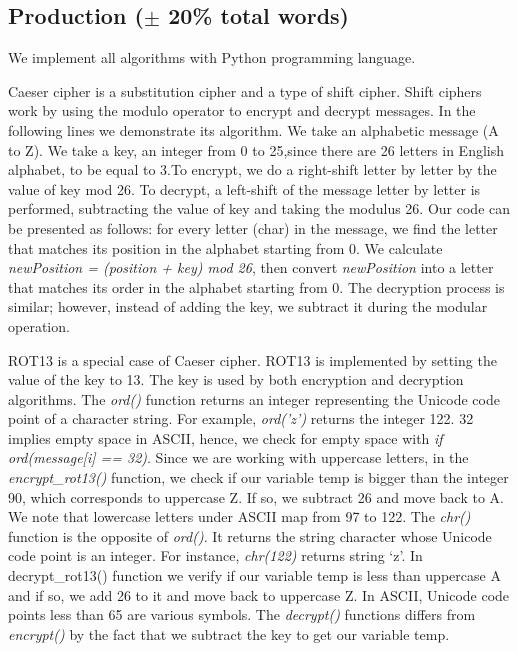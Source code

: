 \subsection{Production ($\pm$ 20\% total words)}

We implement all algorithms with Python programming language. 

Caeser cipher is a substitution cipher and a type of shift cipher. Shift ciphers work by using the modulo operator to encrypt and decrypt messages. In the following lines we demonstrate its algorithm. We take an alphabetic message (A to Z). We take a key, an integer from 0 to 25,since there are 26 letters in English alphabet, to be equal to 3.To encrypt, we do a right-shift letter by letter by the value of key mod 26. To decrypt, a left-shift of the message letter by letter is performed, subtracting the value of key and taking the modulus 26. Our code can be presented as follows: for every letter (char) in the message, we find the letter that matches its position in the alphabet starting from 0. We calculate \textit{newPosition = (position + key) mod 26}, then convert \textit{newPosition} into a letter that matches its order in the alphabet starting from 0. The decryption process is similar; however, instead of adding the key, we subtract it during the modular operation.

ROT13 is a special case of Caeser cipher. ROT13 is implemented by setting the value of the key to 13. The key is used by both encryption and decryption algorithms. The \textit{ord()} function returns an integer representing the Unicode code point of a character string. For example, \textit{ord('z')} returns the integer 122. 32 implies empty space in ASCII, hence, we check for empty space with \textit{if ord(message[i] == 32)}. Since we are working with uppercase letters, in the \textit{encrypt\_rot13()} function, we check if our variable temp is bigger than the integer 90, which corresponds to uppercase Z. If so, we subtract 26 and move back to A. We note that lowercase letters under ASCII map from 97 to 122. The \textit{chr()} function is the opposite of \textit{ord()}. It returns the string character whose Unicode code point is an integer. For instance, \textit{chr(122)} returns string ‘z’. In decrypt\_rot13() function we verify if our variable temp is less than uppercase A and if so, we add 26 to it and move back to uppercase Z. In ASCII, Unicode code points less than 65 are various symbols. The \textit{decrypt()} functions differs from \textit{encrypt()} by the fact that we subtract the key to get our variable temp. 

